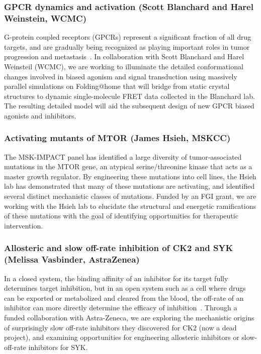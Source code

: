 \documentclass[10pt]{article}
\begin{document}
\vspace{-0.5cm}
\subsubsection*{GPCR dynamics and activation (Scott Blanchard and Harel Weinstein, WCMC)}
\vspace{-0.3cm}
G-protein coupled receptors (GPCRs) represent a significant fraction of all drug targets, and are gradually being recognized as playing important roles in tumor progression and metastasis~\cite{Dorsam:2007:Nat.Rev.Cancera}.
In collaboration with Scott Blanchard and Harel Weinsteil (WCMC), we are working to illuminate the detailed conformational changes involved in biased agonism and signal transduction using massively parallel simulations on Folding@home that will bridge from static crystal structures to dynamic single-molecule FRET data collected in the Blanchard lab.
The resulting detailed model will aid the subsequent design of new GPCR biased agonists and inhibitors.

\vspace{-0.5cm}
\subsubsection*{Activating mutants of MTOR (James Hsieh, MSKCC)}
\vspace{-0.3cm}
The MSK-IMPACT panel has identified a large diversity of tumor-associated mutations in the MTOR gene, an atypical serine/threonine kinase that acts as a master growth regulator.
By engineering these mutations into cell lines, the Hsieh lab has demonstrated that many of these mutations are activating, and identified several distinct mechanistic classes of mutations.
Funded by an FGI grant, we are working with the Hsieh lab to elucidate the structural and energetic ramifications of these mutations with the goal of identifying opportunities for therapeutic intervention.

\vspace{-0.5cm}
\subsubsection*{Allosteric and slow off-rate inhibition of CK2 and SYK (Melissa Vasbinder, AstraZenea)}
\vspace{-0.3cm}
In a closed system, the binding affinity of an inhibitor for its target fully determines target inhibition, but in an open system such as a cell where drugs can be exported or metabolized and cleared from the blood, the off-rate of an inhibitor can more directly determine the efficacy of inhibition~\cite{copeland:nrdd:2007:residence-time}.
Through a funded collaboration with Astra-Zeneca, we are exploring the mechanistic origins of surprisingly slow off-rate inhibitors they discovered for CK2 (now a dead project), and examining opportunities for engineering allosteric inhibitors or slow-off-rate inhibitors for SYK.
\end{document}
